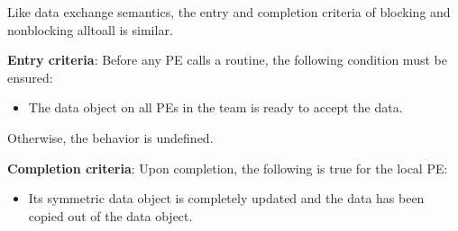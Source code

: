 \begin{apidefinition}
{    
    Like data exchange semantics, the entry and completion
    criteria of blocking and nonblocking alltoall is similar. 

    {\bf Entry criteria}: Before any \ac{PE} calls a  routine,
    the following condition must be ensured:
    \begin{itemize}
    \item The  data object on all \acp{PE} in the team is
      ready to accept the  data.
    \end{itemize}
    Otherwise, the behavior is undefined.

    {\bf Completion criteria}: Upon completion, the following is true for
    the local PE:
    \begin{itemize}
    \item Its  symmetric data object is completely updated and
    the data has been copied out of the  data object.
    \end{itemize}
}


\end{apidefinition}

